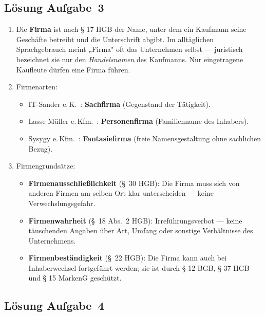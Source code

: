 \documentclass[11pt, a4paper]{article}
\begin{document}
\subsection*{Lösung Aufgabe~3}

\begin{enumerate}[label=(\alph*)]
  \item Die \textbf{Firma} ist nach § 17 HGB der Name, unter dem ein Kaufmann seine Geschäfte
  betreibt und die Unterschrift abgibt. Im alltäglichen Sprachgebrauch meint „Firma" oft das
  Unternehmen selbst --- juristisch bezeichnet sie nur den \emph{Handelsnamen} des Kaufmanns.
  Nur eingetragene Kaufleute dürfen eine Firma führen.

  \item Firmenarten:
  \begin{itemize}
    \item IT-Sander e.\,K.~: \textbf{Sachfirma} (Gegenstand der Tätigkeit).
    \item Lasse Müller e.\,Kfm.~: \textbf{Personenfirma} (Familienname des Inhabers).
    \item Sysygy e.\,Kfm.~: \textbf{Fantasiefirma} (freie Namensgestaltung ohne sachlichen Bezug).
  \end{itemize}

  \item Firmengrundsätze:
  \begin{itemize}
    \item \textbf{Firmenausschließlichkeit} (§~30 HGB): Die Firma muss sich von anderen Firmen
    am selben Ort klar unterscheiden --- keine Verwechslungsgefahr.
    \item \textbf{Firmenwahrheit} (§~18 Abs.~2 HGB): Irreführungsverbot --- keine täuschenden
    Angaben über Art, Umfang oder sonstige Verhältnisse des Unternehmens.
    \item \textbf{Firmenbeständigkeit} (§~22 HGB): Die Firma kann auch bei Inhaberwechsel
    fortgeführt werden; sie ist durch § 12 BGB, § 37 HGB und § 15 MarkenG geschützt.
  \end{itemize}
\end{enumerate}

\subsection*{Lösung Aufgabe~4}
\end{document}
